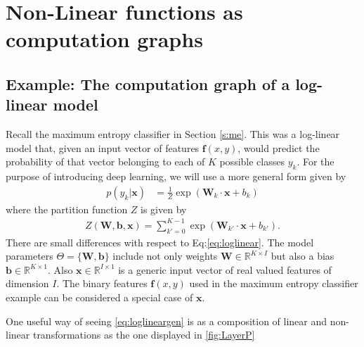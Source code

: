\section{Non-Linear functions as computation graphs} 

\subsection{Example: The computation graph of a log-linear model}


Recall the maximum entropy classifier in Section \ref{s:me}. This was a log-linear
model that, given an input vector of features $\boldsymbol{f}(x,y)$, would
predict the probability of that vector belonging to each of $K$ possible
classes $y_k$. For the purpose of introducing deep learning, we will use a more
general form given by 
%
\begin{align}
p(y_k|\mathbf{x}) & = \frac{1}{Z}\exp(\mathbf{W}_k \cdot \mathbf{x} + b_k)
\label{eq:loglineargen}
\end{align}
%
where the partition function $Z$ is given by
%
\begin{align}
Z(\mathbf{W},\mathbf{b},\mathbf{x}) = \sum_{k'=0}^{K-1} \exp(\mathbf{W}_{k'} \cdot \mathbf{x} + b_{k'}). 
\label{eq:loglineargenPartition}
\end{align}
%
There are small differences with respect to  Eq:\ref{eq:loglinear}. The model
parameters $\Theta=\{\mathbf{W}, \mathbf{b}\}$ include not only weights
$\mathbf{W} \in \mathbb{R}^{K \times I}$ but also a bias $\mathbf{b} \in
\mathbb{R}^{K \times 1}$. Also $\mathbf{x} \in \mathbb{R}^{I \times 1}$ is a
generic input vector of real valued features of dimension $I$.  The binary
features $\boldsymbol{f}(x,y)$ used in the maximum entropy classifier example
can be considered a special case of $\mathbf{x}$.    

\noindent One useful way of seeing \ref{eq:loglineargen} is as a composition of
linear and non-linear transformations as the one displayed in \ref{fig:LayerP} 

